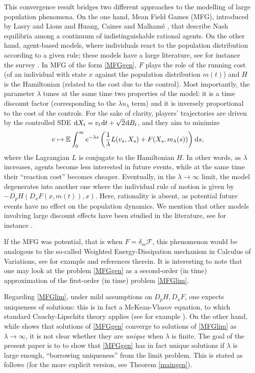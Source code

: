 \documentclass{amsart}
\theoremstyle{remark}
\theoremstyle{definition}
\theoremstyle{Claim}
\newcommand{\E}{\mathbb{E}}
\newcommand{\dd}{\hspace{0.7pt}{\rm d}}
\theoremstyle{plain}
\begin{document}
	This convergence result bridges two different approaches to the modelling of large population phenomena. On the one hand, Mean Field Games (MFG), introduced by Lasry and Lions \cite{LL07} and Huang, Caines and Malham\'e \cite{hcm}, that describe Nash equilibria among a continuum of indistinguishable rational agents. On the other hand, agent-based models, where individuals react to the population distribution according to a given rule; these models have a large literature, see for instance the survey \cite{CCPsurvey}. In MFG of the form \eqref{MFGgen}, $F$ plays the role of the running cost (of an individual with state $x$ against the population distribution $m(t)$) and $H$ is the Hamiltonian (related to the cost due to the control). Most importantly, the parameter $\lambda$ tunes at the same time two properties of the model: it is a time discount factor (corresponding to the $\lambda u_\lambda$ term) and it is inversely proportional to the cost of the controls. For the sake of clarity, players' trajectories are driven by the controlled SDE $\dd X_t = v_t \dd t + \sqrt 2 \dd B_t$, and they aim to minimize
	\[
	v \mapsto \E \int_0^\infty e^{-\lambda s}\left( \frac1\lambda L(v_s, X_s) + F(X_s, m_\lambda(s)) \right) \dd s,
	\]
	where the Lagrangian $L$ is conjugate to the Hamiltonian $H$. In other words, as $\lambda$ increases, agents become less interested in future events, while at the same time their ``reaction cost'' becomes cheaper. Eventually, in the $\lambda \to \infty$ limit, the model degenerates into another one where the individual rule of motion is given by $-D_pH(D_x F(x,m(t)),x)$. Here, rationality is absent, as potential future events have no effect on the population dynamics. We mention that other models involving large discount effects have been studied in the literature, see for instance \cite{BLL19,DHL17}. 
	
	If the MFG was potential, that is when $F = \delta_m \mathcal F$, this phenomenon would be analogous to the so-called Weighted Energy-Dissipation mechanism in Calculus of Variations, see for example \cite{RSSS, MS} and references therein. It is interesting to note that one may look at the problem \eqref{MFGgen} as a second-order (in time) approximation of the first-order (in time) problem \eqref{MFGlim}.
	
	Regarding \eqref{MFGlim}, under mild assumptions on $D_p H, D_x F$, one expects uniqueness of solutions: this is in fact a McKean-Vlasov equation, to which standard Cauchy-Lipschitz theory applies (see for example \cite{BKRS}). On the other hand, while \cite{BC} shows that solutions of \eqref{MFGgen} converge to solutions of \eqref{MFGlim} as $\lambda \to \infty$, it is not clear whether they are \textit{unique} when $\lambda$ is finite. The goal of the present paper is to to show that \eqref{MFGgen} has in fact unique solutions if $\lambda$ is large enough, ``borrowing uniqueness'' from the limit problem. This is stated as follows (for the more explicit version, see Theorem \ref{maingen}).
	
\end{document}
